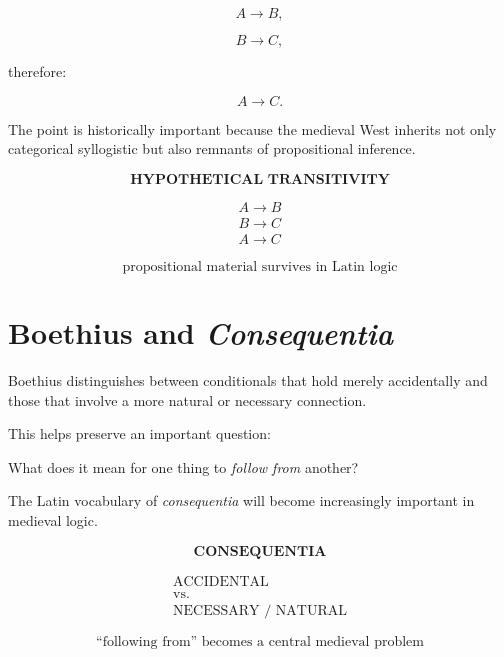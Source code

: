 \documentclass[11pt]{article}
\newcommand{\latin}[1]{\textit{#1}}
\begin{document}
\[
A \rightarrow B,
\]

\[
B \rightarrow C,
\]

therefore:

\[
A \rightarrow C.
\]

The point is historically important because the medieval West
inherits not only categorical syllogistic but also remnants of
propositional inference.

\begin{whiteboard}
\[
\textbf{HYPOTHETICAL TRANSITIVITY}
\]

\[
\begin{array}{c}
A \rightarrow B\\
B \rightarrow C\\
\hline
A \rightarrow C
\end{array}
\]

\[
\boxed{\text{propositional material survives in Latin logic}}
\]
\end{whiteboard}

\section{Boethius and \textit{Consequentia}}

Boethius distinguishes between conditionals that hold merely
accidentally and those that involve a more natural or necessary
connection.

This helps preserve an important question:

\begin{center}
What does it mean for one thing to \emph{follow from} another?
\end{center}

The Latin vocabulary of \latin{consequentia} will become
increasingly important in medieval logic.

\begin{whiteboard}
\[
\textbf{CONSEQUENTIA}
\]

\[
\begin{array}{c}
\text{ACCIDENTAL}\\[0.3em]
\text{vs.}\\[0.3em]
\text{NECESSARY / NATURAL}
\end{array}
\]

\[
\boxed{\text{``following from'' becomes a central medieval problem}}
\]
\end{whiteboard}
\end{document}
